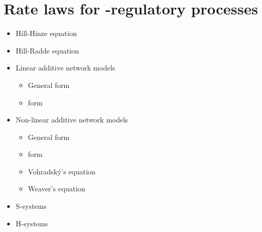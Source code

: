 \section{Rate laws for {\gene}-regulatory processes}
\begin{itemize}
  \item Hill-Hinze equation \citep{Hinze2007}
  \item Hill-Radde equation \citep{Radde2007a, Radde2007}
  \item Linear additive network models
    \begin{itemize}
      \item General form
      \item \NetGenerator form \citep{Toepfer2007}
    \end{itemize}
  \item Non-linear additive network models
    \begin{itemize}
      \item General form
      \item \NetGenerator form \citep{Toepfer2007}
      \item Vohradsk{\'y}'s equation \citep{Vu2007}
      \item Weaver's equation \citep{Weaver1999}
    \end{itemize}
  \item S-systems \citep{Savageau1969, spieth04optimizing, Tournier2005, Spieth2006, Hecker2009}
  \item H-systems \citep{Spieth2006}
\end{itemize}

